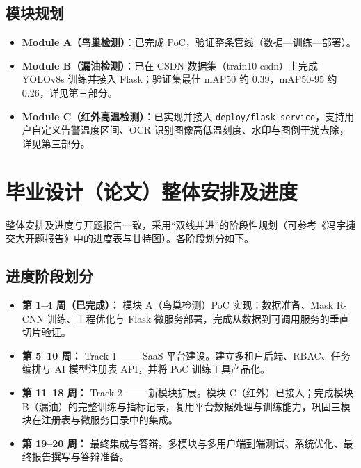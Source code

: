 \documentclass[12pt,a4paper]{article}
\begin{document}
\subsection{模块规划}

\begin{itemize}
  \item \textbf{Module A（鸟巢检测）}：已完成 PoC，验证整条管线（数据—训练—部署）。
  \item \textbf{Module B（漏油检测）}：已在 CSDN 数据集（train10-csdn）上完成 YOLOv8s 训练并接入 Flask；验证集最佳 mAP50 约 0.39，mAP50-95 约 0.26，详见第三部分。
  \item \textbf{Module C（红外高温检测）}：已实现并接入 \texttt{deploy/flask-service}，支持用户自定义告警温度区间、OCR 识别图像高低温刻度、水印与图例干扰去除，详见第三部分。
\end{itemize}

\section{毕业设计（论文）整体安排及进度}

整体安排及进度与开题报告一致，采用“双线并进”的阶段性规划（可参考《冯宇捷交大开题报告》中的进度表与甘特图）。各阶段划分如下。

\subsection{进度阶段划分}

\begin{itemize}
  \item \textbf{第 1--4 周（已完成）：} 模块 A（鸟巢检测）PoC 实现：数据准备、Mask R-CNN 训练、工程优化与 Flask 微服务部署，完成从数据到可调用服务的垂直切片验证。
  \item \textbf{第 5--10 周：} Track 1 —— SaaS 平台建设。建立多租户后端、RBAC、任务编排与 AI 模型注册表 API，并将 PoC 训练工具产品化。
  \item \textbf{第 11--18 周：} Track 2 —— 新模块扩展。模块 C（红外）已接入；完成模块 B（漏油）的完整训练与指标记录，复用平台数据处理与训练能力，巩固三模块在注册表与微服务目录中的集成。
  \item \textbf{第 19--20 周：} 最终集成与答辩。多模块与多用户端到端测试、系统优化、最终报告撰写与答辩准备。
\end{itemize}
\end{document}
